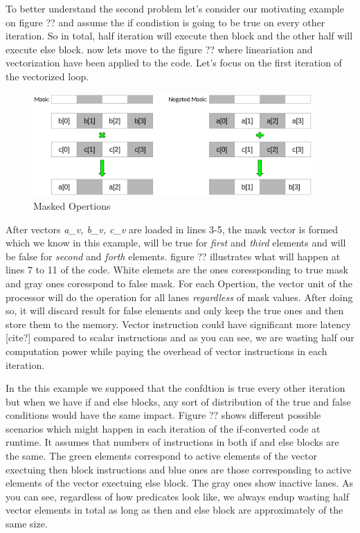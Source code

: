 \documentclass[\main/thesis.tex]{subfiles}
\begin{document}
To better understand the second problem let's consider our motivating example on figure ?? and assume the if condistion is going to be true on every other iteration. So in total, half iteration will execute then block and the other half will execute else block.
now lets move to the figure ?? where lineariation and vectorization have been applied to the code. Let's focus on the first iteration of the vectorized loop.


\begin{figure}[t!]
    \centering
    \includegraphics[width=0.95\textwidth]{img/masked_operations.png}
    \caption{Masked Opertions}
    \label{fig:masked_multiplication}
\end{figure}

After vectors \emph{a\_v, b\_v, c\_v} are loaded in lines 3-5, the mask vector is formed which we know in this example, will be true for \emph{first} and \emph{third} elements and will be false for \emph{second} and \emph{forth} elements. figure ?? illustrates what will happen at lines 7 to 11 of the code. White elemets are the ones coressponding to true mask and gray ones coresspond to false mask.
For each Opertion, the vector unit of the processor will do the operation for all lanes \emph{regardless} of mask values. After doing so, it will discard result for false elements and only keep the true ones and then store them to the memory. Vector instruction could have significant more latency [cite?] compared to scalar instructions and as you can see, we are wasting half our computation power while paying the overhead of vector instructions in each iteration.

In the this example we supposed that the confdtion is true every other iteration but when we have if and else blocks, any sort of distribution of the true and false conditions would have the same impact. Figure ?? shows different possible scenarios which might happen in each iteration of the if-converted code at runtime. It assumes that numbers of instructions in both if and else blocks are the same. The green elements correspond to active elements of the vector exectuing then block 
instructions and blue ones are those corresponding to active elements of the vector exectuing else block. The gray ones show inactive lanes. As you can see, regardless of how predicates look like, we always endup wasting half vector elements in total as long as then and else block are approximately of the same size. 
\end{document}
